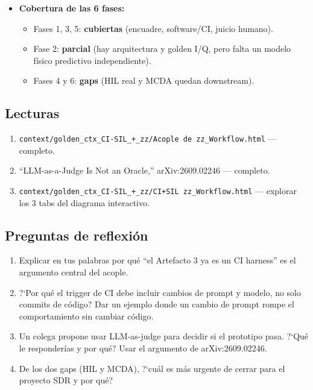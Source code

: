 \documentclass[11pt,a4paper]{article}
\begin{document}
\begin{itemize}
  \item \textbf{Cobertura de las 6 fases:}
    \begin{itemize}
      \item Fases 1, 3, 5: \textbf{cubiertas} (encuadre, software/CI, juicio humano).
      \item Fase 2: \textbf{parcial} (hay arquitectura y golden I/Q, pero falta un modelo f\'isico predictivo independiente).
      \item Fases 4 y 6: \textbf{gaps} (HIL real y MCDA quedan downstream).
    \end{itemize}
\end{itemize}

\subsection{Lecturas}
\begin{enumerate}[label=\textbf{L\arabic*.}]
  \item \texttt{context/golden\_ctx\_CI-SIL\_+\_zz/Acople de zz\_Workflow.html} --- completo.
  \item ``LLM-as-a-Judge Is Not an Oracle,'' arXiv:2609.02246 --- completo.
  \item \texttt{context/golden\_ctx\_CI-SIL\_+\_zz/CI+SIL \texttimes{} zz\_Workflow.html} --- explorar los 3 tabs del diagrama interactivo.
\end{enumerate}

\subsection{Preguntas de reflexi\'on}
\begin{enumerate}[label=\textbf{R\arabic*.}]
  \item Explicar en tus palabras por qu\'e ``el Artefacto 3 ya es un CI harness'' es el argumento central del acople.
  \item ?`Por qu\'e el trigger de CI debe incluir cambios de prompt y modelo, no solo commits de c\'odigo? Dar un ejemplo donde un cambio de prompt rompe el comportamiento sin cambiar c\'odigo.
  \item Un colega propone usar LLM-as-judge para decidir si el prototipo pasa. ?`Qu\'e le responder\'ias y por qu\'e? Usar el argumento de arXiv:2609.02246.
  \item De los dos gaps (HIL y MCDA), ?`cu\'al es m\'as urgente de cerrar para el proyecto SDR y por qu\'e?
\end{enumerate}
\end{document}
